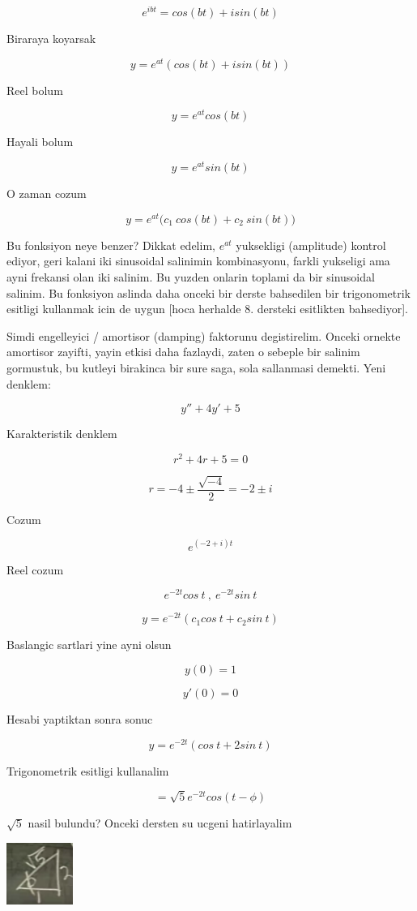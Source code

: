 \documentclass[12pt,fleqn]{article}
\begin{document}
\[ e^{ibt} = cos(bt) + isin(bt) \]

Biraraya koyarsak

\[ y = e^{at} (cos(bt) + isin(bt)) \]

Reel bolum

\[ y = e^{at}cos(bt) \] 

Hayali bolum

\[ y = e^{at}sin(bt) \] 

O zaman cozum

\[ y = e^{at} \bigg( c_1 \ cos(bt) + c_2 \ sin(bt) \bigg) \]

Bu fonksiyon neye benzer? Dikkat edelim, $e^{at}$ yuksekligi (amplitude)
kontrol ediyor, geri kalani iki sinusoidal salinimin kombinasyonu, farkli
yukseligi ama ayni frekansi olan iki salinim. Bu yuzden onlarin toplami da
bir sinusoidal salinim. Bu fonksiyon aslinda daha onceki bir derste
bahsedilen bir trigonometrik esitligi kullanmak icin de uygun [hoca
herhalde 8. dersteki esitlikten bahsediyor].

Simdi engelleyici / amortisor (damping) faktorunu degistirelim. Onceki
ornekte amortisor zayifti, yayin etkisi daha fazlaydi, zaten o sebeple bir
salinim gormustuk, bu kutleyi birakinca bir sure saga, sola sallanmasi
demekti. Yeni denklem:

\[ y'' + 4y' + 5 \]

Karakteristik denklem

\[ r^2 + 4r + 5 = 0 \]

\[ r = -4 \pm \frac{\sqrt{-4}}{2} = -2 \pm i\]

Cozum

\[ e^{(-2+i)t} \]

Reel cozum

\[ e^{-2t}cos \ t \ , \ e^{-2t}sin \ t\]

\[ y = e^{-2t} (c_1 cos \ t + c_2 sin \ t) \]

Baslangic sartlari yine ayni olsun

\[ y(0) = 1 \]

\[ y'(0) = 0 \]

Hesabi yaptiktan sonra sonuc

\[ y = e^{-2t} (cos \ t + 2 sin \ t) \]

Trigonometrik esitligi kullanalim

\[ = \sqrt{5}e^{-2t} cos (t - \phi) \]

$\sqrt{5}$ nasil bulundu? Onceki dersten su ucgeni hatirlayalim

\includegraphics[height=2cm]{9_3.png}
\end{document}
